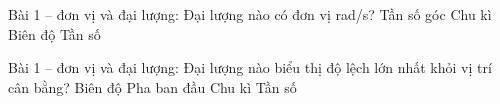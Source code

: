\begin{ex}
Bài 1 – đơn vị và đại lượng: Đại lượng nào có đơn vị rad/s?
\choice
{\True Tần số góc}
{Chu kì}
{Biên độ}
{Tần số}
\end{ex}

\begin{ex}
Bài 1 – đơn vị và đại lượng: Đại lượng nào biểu thị độ lệch lớn nhất khỏi vị trí cân bằng?
\choice
{\True Biên độ}
{Pha ban đầu}
{Chu kì}
{Tần số}
\end{ex}
